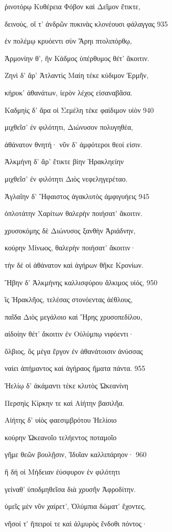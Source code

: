 ῥινοτόρῳ Κυθέρεια Φόβον καὶ Δεῖμον ἔτικτε, 

δεινούς, οἵ τ' ἀνδρῶν πυκινὰς κλονέουσι φάλαγγας \num{935}

ἐν πολέμῳ κρυόεντι σὺν Ἄρηι πτολιπόρθῳ,

Ἁρμονίην θ', ἣν Κάδμος ὑπέρθυμος θέτ' ἄκοιτιν. 

Ζηνὶ δ' ἄρ' Ἀτλαντὶς Μαίη τέκε κύδιμον Ἑρμῆν,

κήρυκ' ἀθανάτων, ἱερὸν λέχος εἰσαναβᾶσα.

Καδμηὶς δ' ἄρα οἱ Σεμέλη τέκε φαίδιμον υἱὸν \num{940} 

μιχθεῖσ' ἐν φιλότητι, Διώνυσον πολυγηθέα, 

ἀθάνατον θνητή· νῦν δ' ἀμφότεροι θεοί εἰσιν. 

Ἀλκμήνη δ' ἄρ' ἔτικτε βίην Ἡρακληείην

μιχθεῖσ' ἐν φιλότητι Διὸς νεφεληγερέταο. 

Ἀγλαΐην δ' Ἥφαιστος ἀγακλυτὸς ἀμφιγυήεις \num{945} 

ὁπλοτάτην Χαρίτων θαλερὴν ποιήσατ' ἄκοιτιν.

χρυσοκόμης δὲ Διώνυσος ξανθὴν Ἀριάδνην,

κούρην Μίνωος, θαλερὴν ποιήσατ' ἄκοιτιν· 

τὴν δέ οἱ ἀθάνατον καὶ ἀγήρων θῆκε Κρονίων.

Ἥβην δ' Ἀλκμήνης καλλισφύρου ἄλκιμος υἱός, \num{950} 

ἲς Ἡρακλῆος, τελέσας στονόεντας ἀέθλους,

παῖδα Διὸς μεγάλοιο καὶ Ἥρης χρυσοπεδίλου,

αἰδοίην θέτ' ἄκοιτιν ἐν Οὐλύμπῳ νιφόεντι· 

ὄλβιος, ὃς μέγα ἔργον ἐν ἀθανάτοισιν ἀνύσσας

ναίει ἀπήμαντος καὶ ἀγήραος ἤματα πάντα. \num{955}

Ἠελίῳ δ' ἀκάμαντι τέκε κλυτὸς Ὠκεανίνη 

Περσηὶς Κίρκην τε καὶ Αἰήτην βασιλῆα.

Αἰήτης δ' υἱὸς φαεσιμβρότου Ἠελίοιο

κούρην Ὠκεανοῖο τελήεντος ποταμοῖο

γῆμε θεῶν βουλῇσιν, Ἰδυῖαν καλλιπάρηον· \num{960}

ἣ δή οἱ Μήδειαν ἐύσφυρον ἐν φιλότητι

γείναθ' ὑποδμηθεῖσα διὰ χρυσῆν Ἀφροδίτην. 

ὑμεῖς μὲν νῦν χαίρετ', Ὀλύμπια δώματ' ἔχοντες, 

νῆσοί τ' ἤπειροί τε καὶ ἁλμυρὸς ἔνδοθι πόντος· 


